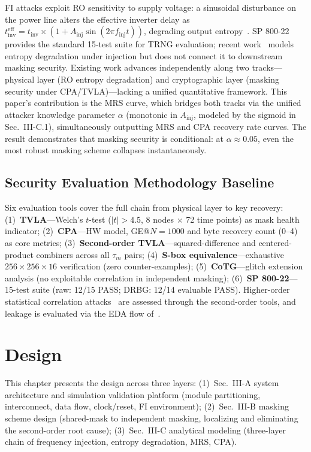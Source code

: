 \documentclass[journal]{IEEEtran}
\begin{document}
FI attacks exploit RO sensitivity to supply voltage: a sinusoidal disturbance on the power line alters the effective inverter delay as $t_{\text{inv}}^{\text{eff}} = t_{\text{inv}} \times (1 + A_{\text{inj}} \sin(2\pi f_{\text{inj}} t))$, degrading output entropy~\cite{sun2023frequency}. SP 800-22~\cite{nist2010sp80022} provides the standard 15-test suite for TRNG evaluation; recent work~\cite{chen2024robustness} models entropy degradation under injection but does not connect it to downstream masking security. Existing work advances independently along two tracks---physical layer (RO entropy degradation) and cryptographic layer (masking security under CPA/TVLA)---lacking a unified quantitative framework. This paper's contribution is the MRS curve, which bridges both tracks via the unified attacker knowledge parameter $\alpha$ (monotonic in $A_{\text{inj}}$, modeled by the sigmoid in Sec.~III-C.1), simultaneously outputting MRS and CPA recovery rate curves. The result demonstrates that masking security is conditional: at $\alpha \approx 0.05$, even the most robust masking scheme collapses instantaneously.

\subsection{Security Evaluation Methodology Baseline}

Six evaluation tools cover the full chain from physical layer to key recovery: (1)~\textbf{TVLA}---Welch's $t$-test ($|t| > 4.5$, 8 nodes $\times$ 72 time points) as mask health indicator; (2)~\textbf{CPA}---HW model, GE@$\mathit{N=1000}$ and byte recovery count (0--4) as core metrics; (3)~\textbf{Second-order TVLA}---squared-difference and centered-product combiners across all $\tau_m$ pairs; (4)~\textbf{S-box equivalence}---exhaustive $256 \times 256 \times 16$ verification (zero counter-examples); (5)~\textbf{CoTG}---glitch extension analysis (no exploitable correlation in independent masking); (6)~\textbf{SP 800-22}---15-test suite (raw: 12/15 PASS; DRBG: 12/14 evaluable PASS). Higher-order statistical correlation attacks~\cite{cheng2024statistical} are assessed through the second-order tools, and leakage is evaluated via the EDA flow of~\cite{saha2024valiant}.

\section{Design}

This chapter presents the design across three layers: (1)~Sec.~III-A system architecture and simulation validation platform (module partitioning, interconnect, data flow, clock/reset, FI environment); (2)~Sec.~III-B masking scheme design (shared-mask to independent masking, localizing and eliminating the second-order root cause); (3)~Sec.~III-C analytical modeling (three-layer chain of frequency injection, entropy degradation, MRS, CPA).
\end{document}
